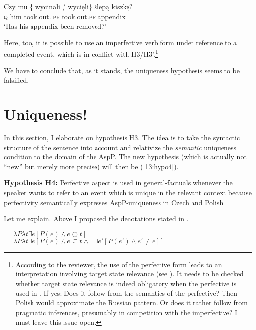 \documentclass[output=paper,
modfonts,
newtxmath,
hidelinks
]{langscibook}
\begin{document}
\begin{exe}
\ex\label{13:blinddarmpo}
\gll Czy mu  \{\hspace{-2pt} wycinali / wyci\k eli\}  {\'slep\k a kiszk\k e?} \\
\textsc{q} him {} took.out.\textsc{ipf} {} took.out.\textsc{pf} appendix \\
\glt `Has his appendix been removed?'
\end{exe}

\noindent Here, too, it is possible to use an imperfective verb form under reference to a completed event, which is in conflict with H3/H3'.\footnote{According to the reviewer, the use of the perfective form leads to an interpretation involving target state relevance (see ). It needs to be checked whether target state relevance is indeed obligatory when the perfective is used in . If yes: Does it follow from the semantics of the perfective? Then Polish would approximate the Russian pattern. Or does it rather follow from pragmatic inferences, presumably in competition with the imperfective? I must leave this issue open.}

We have to conclude that, as it stands, the uniqueness hypothesis seems to be falsified.  

\section{Uniqueness!}\label{13:s6} 

In this section, I elaborate on hypothesis H3. The idea is to take the syntactic structure of the sentence into account 
and relativize the \textit{semantic} uniqueness condition to the domain of the AspP. The new hypothesis (which is actually not ``new'' but merely more precise) will then be (\ref{13:hypo4}). 

\begin{exe}
\ex\label{13:hypo4}
\textbf{Hypothesis H4:} Perfective aspect is used in general-factuals whenever the speaker wants to refer to an event which is unique in the relevant context because perfectivity semantically expresses AspP-uniqueness in Czech and Polish. 
\end{exe}

\noindent Let me explain. Above I proposed the denotations stated in .

\begin{exe}
\ex\label{13:semas}
${}= \lambda P \lambda t \exists e [ P(e) \wedge e \bigcirc t ]$\smallskip\\
${}= \lambda P \lambda t \exists e [ P(e) \wedge e \subseteq t \wedge \neg \exists e'[ P(e') \wedge e' \neq e ]]$
\end{exe}
\end{document}
